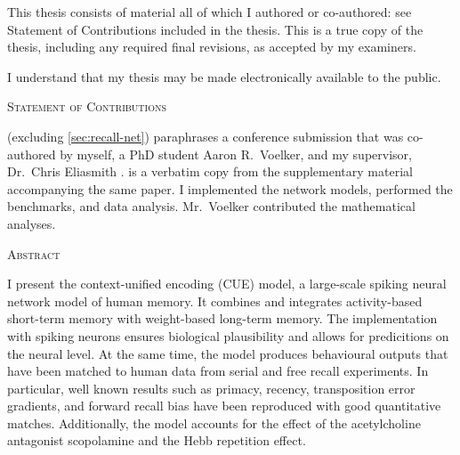   \noindent
  This thesis consists of material all of which I authored or co-authored: see Statement of Contributions included in the thesis.
  This is a true copy of the thesis, including any required final revisions, as accepted by my examiners.

  \bigskip
  
  \noindent
I understand that my thesis may be made electronically available to the public.

\cleardoublepage

\begin{center}\textsc{Statement of Contributions}\end{center}
 (excluding \cref{sec:recall-net}) paraphrases a conference submission that was co-authored by myself, a PhD student Aaron R.\ Voelker, and my supervisor, Dr.\ Chris Eliasmith \parencite{jangosmann2017}.
 is a verbatim copy from the supplementary material accompanying the same paper.
I implemented the network models, performed the benchmarks, and data analysis.
Mr.~Voelker contributed the mathematical analyses.

\cleardoublepage


\begin{center}\textsc{Abstract}\end{center}
I present the context-unified encoding (CUE) model, a large-scale spiking neural network model of human memory.
It combines and integrates activity-based short-term memory with weight-based long-term memory.
The implementation with spiking neurons ensures biological plausibility and allows for predicitions on the neural level.
At the same time, the model produces behavioural outputs that have been matched to human data from serial and free recall experiments.
In particular, well known results such as primacy, recency, transposition error gradients, and forward recall bias have been reproduced with good quantitative matches.
Additionally, the model accounts for the effect of the acetylcholine antagonist scopolamine and the Hebb repetition effect.

